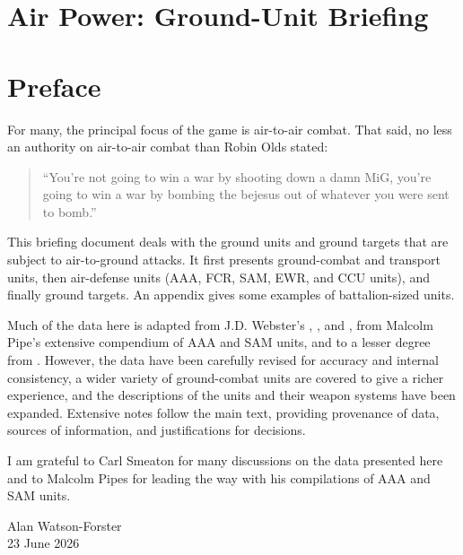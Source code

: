


\section*{Air Power: Ground-Unit Briefing}
\noindent
\documentdate

\setcounter{tocdepth}{1}


\tableofcontents

\listoftables

\newpage

\section*{Preface}

For many, the principal focus of the {\AirPow} game is air-to-air combat.
That said, no less an authority on air-to-air combat than Robin Olds stated:%
\begin{quote}
    “You’re not going to win a war by shooting down a damn MiG, you’re going to win a war by bombing the bejesus out of whatever you were sent to bomb.”
\end{quote}
This briefing document deals with the ground units and ground targets that are subject to air-to-ground attacks.
It first presents ground-combat and transport units, then air-defense units (AAA, FCR, SAM, EWR, and CCU units), and finally ground targets. An appendix gives some examples of battalion-sized units.

Much of the data here is adapted from J.D. Webster's {\AirStr}, {\EOTG}, and {\TSOH}, from Malcolm Pipe's extensive compendium of AAA and SAM units, and to a lesser degree from {\APJ}. However, the data have been carefully revised for accuracy and internal consistency, a wider variety of ground-combat units are covered to give a richer experience, and the descriptions of the units and their weapon systems have been expanded.
Extensive notes follow the main text, providing provenance of data, sources of information, and justifications for decisions.

I am grateful to Carl Smeaton for many discussions on the data presented here and to Malcolm Pipes for leading the way with his compilations of AAA and SAM units.

\medskip
\begin{flushright}
    Alan Watson-Forster\\
    23 June 2026
\end{flushright}
